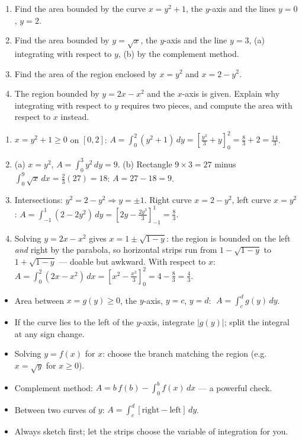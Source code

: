 \documentclass[11pt]{article}
\begin{document}
\begin{exercice}[Practice]
\begin{enumerate}
\item Find the area bounded by the curve $x=y^2+1$, the $y$-axis and the lines $y=0$, $y=2$.
\item Find the area bounded by $y=\sqrt{x}$, the $y$-axis and the line $y=3$, (a) integrating with respect to $y$, (b) by the complement method.
\item Find the area of the region enclosed by $x=y^2$ and $x=2-y^2$.
\item The region bounded by $y=2x-x^2$ and the $x$-axis is given. Explain why integrating with respect to $y$ requires two pieces, and compute the area with respect to $x$ instead.
\end{enumerate}
\end{exercice}

\begin{corrige}[Exercise 1]
\begin{enumerate}
\item $x=y^2+1\geq 0$ on $[0,2]$: $A=\displaystyle\int_0^2(y^2+1)\,dy=\left[\frac{y^3}{3}+y\right]_0^2=\frac{8}{3}+2=\frac{14}{3}$.
\item (a) $x=y^2$, $A=\displaystyle\int_0^3 y^2\,dy=9$. (b) Rectangle $9\times 3=27$ minus $\displaystyle\int_0^9\sqrt{x}\,dx=\frac{2}{3}(27)=18$: $A=27-18=9$.
\item Intersections: $y^2=2-y^2\Rightarrow y=\pm1$. Right curve $x=2-y^2$, left curve $x=y^2$: $A=\displaystyle\int_{-1}^{1}(2-2y^2)\,dy=\left[2y-\frac{2y^3}{3}\right]_{-1}^{1}=\frac{8}{3}$.
\item Solving $y=2x-x^2$ gives $x=1\pm\sqrt{1-y}$: the region is bounded on the left \emph{and} right by the parabola, so horizontal strips run from $1-\sqrt{1-y}$ to $1+\sqrt{1-y}$ — doable but awkward. With respect to $x$: $A=\displaystyle\int_0^2(2x-x^2)\,dx=\left[x^2-\frac{x^3}{3}\right]_0^2=4-\frac{8}{3}=\frac{4}{3}$.
\end{enumerate}
\end{corrige}

\begin{aretenir}
\begin{itemize}
\item Area between $x=g(y)\geq 0$, the $y$-axis, $y=c$, $y=d$: $\;A=\displaystyle\int_c^d g(y)\,dy$.
\item If the curve lies to the left of the $y$-axis, integrate $|g(y)|$; split the integral at any sign change.
\item Solving $y=f(x)$ for $x$: choose the branch matching the region (e.g.\ $x=\sqrt{y}$ for $x\geq 0$).
\item Complement method: $A=b\,f(b)-\displaystyle\int_0^b f(x)\,dx$ — a powerful check.
\item Between two curves of $y$: $A=\displaystyle\int_c^d[\text{right}-\text{left}]\,dy$.
\item Always sketch first; let the strips choose the variable of integration for you.
\end{itemize}
\end{aretenir}
\end{document}
